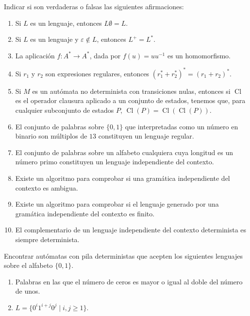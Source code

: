 \documentclass[12pt]{article}
\begin{document}
    \begin{ejercicio}[2.5 puntos]
        Indicar si son verdaderas o falsas las siguientes afirmaciones:
        \begin{enumerate}
            \item Si $L$ es un lenguaje, entonces $L\emptyset = L$.
            \item Si $L$ es un lenguaje y $\varepsilon \notin L$, entonces $L^+ = L^*$.
            
            \item La aplicación $f : A^* \to A^*$, dada por $f(u) = uu^{-1}$ es un homomorfismo.
            \item Si $r_1$ y $r_2$ son expresiones regulares, entonces $(r_1^* + r_2^*)^* = (r_1 + r_2)^*$.
            
            \item Si $M$ es un autómata no determinista con transiciones nulas, entonces si $\operatorname{Cl}$ es el operador clausura aplicado a un conjunto de estados, tenemos que, para cualquier subconjunto de estados $P$, $\operatorname{Cl}(P) = \operatorname{Cl}(\operatorname{Cl}(P))$.
            \item El conjunto de palabras sobre $\{0, 1\}$ que interpretadas como un número en binario son múltiplos de $13$ constituyen un lenguaje regular.
            \item El conjunto de palabras sobre un alfabeto cualquiera cuya longitud es un número primo constituyen un lenguaje independiente del contexto.
            \item Existe un algoritmo para comprobar si una gramática independiente del contexto es ambigua.
            \item Existe un algoritmo para comprobar si el lenguaje generado por una gramática independiente del contexto es finito.
            \item El complementario de un lenguaje independiente del contexto determinista es siempre determinista.
        \end{enumerate}
    \end{ejercicio}

    \begin{ejercicio}[2.5 puntos]
        Encontrar autómatas con pila deterministas que acepten los siguientes lenguajes sobre el alfabeto $\{0, 1\}$.
        \begin{enumerate}
            \item Palabras en las que el número de ceros es mayor o igual al doble del número de unos.
            \item $L = \{0^{i}1^{i+j}0^j \mid i, j \geq 1\}$.
        \end{enumerate}
    \end{ejercicio}
\end{document}
